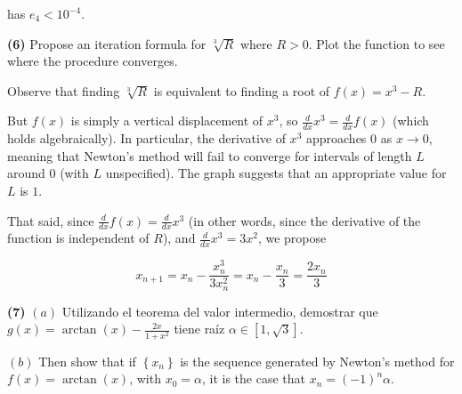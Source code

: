 \documentclass[12pt]{article}
\theoremstyle{definition}
\begin{document}
has $e_4 < 10^{-4}$.

\pagebreak 

\begin{shaded}
    \textbf{(6)} Propose an iteration formula for $\sqrt[3]{R} $ where $R > 0$. Plot the
    function to see where the procedure converges.
\end{shaded}
Observe that finding $\sqrt[3]{R}$ is equivalent to finding a root of $f(x) =
x^3 - R$. 

\begin{center}
\end{center}



But $f(x)$ is simply a vertical displacement of $x^3$, so $\frac{d}{dx} x^3 =
\frac{d}{dx} f(x)$ (which holds algebraically). In particular, the derivative
of $x^3$ approaches $0$ as $x \to 0$, meaning that Newton's method will fail to
converge for intervals of length $L$ around $0$ (with $L$ unspecified). The
graph suggests that an appropriate value for $L$ is $1$.

That said, since $\frac{d}{dx}f(x) = \frac{d}{dx} x^3$ (in other words, since
the derivative of the function is independent of $R$), and $\frac{d}{dx} x^3 =
3x^2$, we propose 

\begin{equation*}
    x_{n+1} = x_n - \frac{x_n^3}{3x_n^2} = x_n - \frac{x_n}{3} = \frac{2x_n}{3}
\end{equation*}

\pagebreak 

\begin{shaded}
    \textbf{(7)} $(a)$ Utilizando el teorema del valor intermedio, demostrar que $g(x)
    = \arctan(x) - \frac{2x}{1+x^2}$ tiene raíz $\alpha \in [1, \sqrt{3}] $. 

    $(b)$ Then show that if $\left\{ x_n \right\} $ is the sequence generated by
    Newton's method for $f(x) = \arctan(x)$, with $x_0 = \alpha$, it is the case 
    that $x_n = (-1)^n \alpha$.
\end{shaded}
\end{document}
